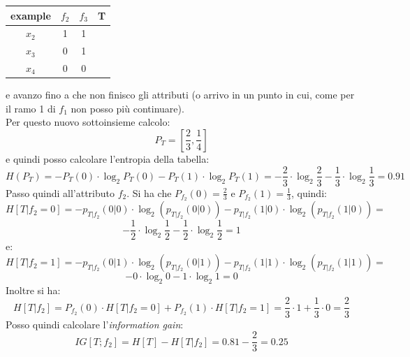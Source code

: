 \begin{esempio}
  \begin{table}[H]
    \centering
    \begin{tabular}{c|c|c|c}
      example  & $f_2$ & $f_3$ & T\\
      \hline
      $x_2$ & 1 & 1 & \color{red}{0}\\
      $x_3$ & 0 & 1 & \color{darkgreen}{1}\\
      $x_4$ & 0 & 0 & \color{red}{0}\\
    \end{tabular}
  \end{table}
  e avanzo fino a che non finisco gli attributi (o arrivo in un punto in cui,
  come per il ramo 1 di $f_1$ non posso più continuare).\\
  Per questo nuovo sottoinsieme calcolo:
  \[P_T=\left[\frac{2}{3},\frac{1}{4}\right]\]
  e quindi posso calcolare l'entropia della tabella:
  \[H(P_T)=-P_T(0)\cdot \log_2 P_T(0)-P_T(1)\cdot\log_2
    P_T(1)=-\frac{2}{3}\cdot\log_2\frac{2}{3}-\frac{1}{3}\cdot\log_2
    \frac{1}{3}= 0.91\]
  Passo quindi all'attributo $f_2$. Si ha che $P_{f_2}(0)=\frac{2}{3}$ e
  $P_{f_2}(1)=\frac{1}{3}$, quindi:
  \[H[T|f_2=0]=-p_{T|f_2}(0|0)\cdot \log_2(p_{T|f_2}(0|0))-p_{T|f_2}(1|0)\cdot
    \log_2(p_{T|f_2}(1|0))=\]
  \[-\frac{1}{2}\cdot \log_2 \frac{1}{2}-\frac{1}{2}\cdot \log_2 \frac{1}{2}=1\]
  e:
  \[H[T|f_2=1]=-p_{T|f_2}(0|1)\cdot \log_2(p_{T|f_2}(0|1))-p_{T|f_2}(1|1)\cdot
    \log_2(p_{T|f_2}(1|1))=\]
  \[-0\cdot \log_2 0-1\cdot \log_2 1=0\]
  Inoltre si ha:
  \[H[T|f_2]=P_{f_2}(0)\cdot H[T|f_2=0]+P_{f_2}(1)\cdot
    H[T|f_2=1]=\frac{2}{3}\cdot 1+\frac{1}{3}\cdot 0=\frac{2}{3}\]
  Posso quindi calcolare l'\textit{information gain}:
  \[IG[T;f_2]=H[T]-H[T|f_2]=0.81-\frac{2}{3}=0.25\]
  

\end{esempio}
